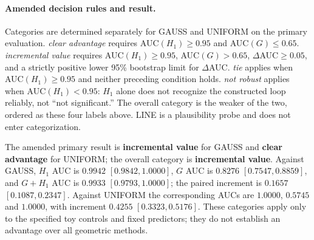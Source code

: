 \begin{table}[htbp]
\centering\small\setlength{\tabcolsep}{4pt}
\caption{Amendment 1 main evaluation: CYCLE versus each control, noise $0.05$,
common projection, 100 evaluation seeds per class. Entries show AUC and paired
95\% bootstrap interval; $\Delta$AUC is AUC$(G+H_1)-$AUC$(G)$.}
\label{tab:toy2amendedauc}

\end{table}

\begin{table}[htbp]
\centering\small
\caption{Accuracy under the frozen $H_1$ threshold or fixed logistic probability
cutoff $0.5$, with 95\% bootstrap intervals, on the same amended primary evaluation.}
\label{tab:toy2amendedaccuracy}

\end{table}

\paragraph{Amended decision rules and result.}
Categories are determined separately for GAUSS and UNIFORM on the primary
evaluation. \textit{clear advantage} requires AUC$(H_1)\geq0.95$ and
AUC$(G)\leq0.65$. \textit{incremental value} requires AUC$(H_1)\geq0.95$,
AUC$(G)>0.65$, $\Delta$AUC$\geq0.05$, and a strictly positive lower
95\% bootstrap limit for $\Delta$AUC. \textit{tie} applies when
AUC$(H_1)\geq0.95$ and neither preceding condition holds.
\textit{not robust} applies when AUC$(H_1)<0.95$: $H_1$ alone does not
recognize the constructed loop reliably, not ``not significant.'' The overall
category is the weaker of the two, ordered as these four labels above.
LINE is a plausibility probe and does not enter categorization.

The amended primary result is \textbf{incremental value} for GAUSS and
\textbf{clear advantage} for UNIFORM; the overall category is
\textbf{incremental value}. Against GAUSS, $H_1$ AUC is $0.9942$
$[0.9842,1.0000]$, $G$ AUC is $0.8276$ $[0.7547,0.8859]$, and $G+H_1$
AUC is $0.9933$ $[0.9793,1.0000]$; the paired increment is $0.1657$
$[0.1087,0.2347]$. Against UNIFORM the corresponding AUCs are $1.0000$,
$0.5745$ and $1.0000$, with increment $0.4255$ $[0.3323,0.5176]$.
These categories apply only to the specified toy controls and fixed predictors;
they do not establish an advantage over all geometric methods.

\begin{table}[p]
\centering\small
\caption{Amended primary evaluation: individual statistics, AUC and accuracy with
95\% bootstrap intervals. The comparison is CYCLE versus the named control;
$g_{1,\mathrm{half}}$ is supplementary and order-dependent.}
\label{tab:toy2amendedgeometry}

\end{table}

